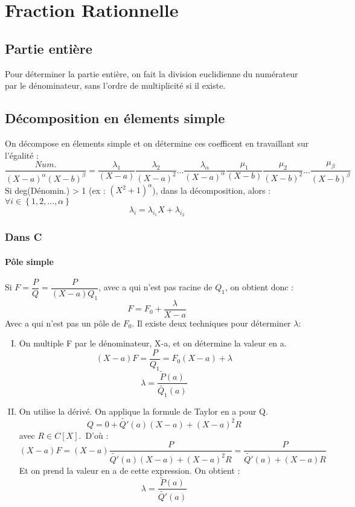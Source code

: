 \chapter{Fraction Rationnelle}
\section{Partie entière}
Pour déterminer la partie entière, on fait la division euclidienne du numérateur par le dénominateur, sans l'ordre de multiplicité si il existe.
\section{Décomposition en élements simple}
On décompose en élements simple et on détermine ces coefficent en travaillant sur l'égalité :
$$\dfrac{Num.}{(X-a)^{\alpha}(X-b)^{\beta}} = \dfrac{\lambda_1}{(X-a)} \dfrac{\lambda_2}{(X-a)^2}...\dfrac{\lambda_{\alpha}}{(X-a)^{\alpha}} \dfrac{\mu_1}{(X-b)} \dfrac{\mu_2}{(X-b)^2}...\dfrac{\mu_{\beta}}{(X-b)^{\beta}}$$
Si deg(Dénomin.) > 1 (ex : $(X^2+1)^{\alpha}$), dans la décomposition, alors :\
$\forall i \in \left\lbrace 1,2,...,\alpha \right\rbrace $
$$\lambda_i = \lambda_{i_1}X+\lambda_{i_2}$$
\subsection{Dans C}
\subsubsection{Pôle simple}
Si $F = \dfrac{P}{Q} = \dfrac{P}{(X-a)Q_1}$, avec a qui n'est pas racine de $Q_1$, on obtient donc : 
$$F = F_0 + \dfrac{\lambda}{X-a}$$
Avec a qui n'est pas un pôle de $F_0$. Il existe deux techniques pour déterminer $\lambda$: 
\begin{enumerate}[I) ]
 \item On multiple F par le dénominateur, X-a, et on détermine la valeur en a. $$(X-a)F= \dfrac{P}{Q_1}=F_0(X-a) + \lambda$$
$$\lambda = \dfrac{\tilde{P}(a)}{\tilde{Q_1}(a)}$$
 \item On utilise la dérivé. On applique la formule de Taylor en a pour Q. 
$$Q = 0 + \tilde{Q'}(a)(X-a) + (X-a)^2R$$
avec $R \in C[X]$.\
D'où :
$$(X-a)F = (X-a)\dfrac{P}{\tilde{Q'}(a)(X-a) + (X-a)^2R} = \dfrac{P}{\tilde{Q'}(a) + (X-a)R}$$
Et on prend la valeur en a de cette expression. On obtient : 
$$\lambda = \dfrac{\tilde{P}(a)}{\tilde{Q'}(a)}$$
\end{enumerate}
